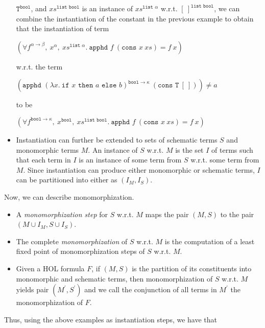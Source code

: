 \documentclass{article}
\begin{document}
\begin{itemize}
			$\texttt{T}^{\texttt{bool}}$, 
			and $xs^{\texttt{list bool}}$ is 
			an instance of 
			$xs^{\texttt{list }\alpha}$ 
			w.r.t. $[\ ]^{\texttt{list bool}}$,
			we can combine the instantiation 
			of the constant in the previous 
			example to obtain that the 
			instantiation of term
			\begin{center}
				$(\forall f^{\alpha \to \beta},\ 
				x^{\alpha},\ xs^{\texttt{list }
				\alpha}.\ \texttt{apphd }f\ 
				(\texttt{cons }x\ xs) = f\ x)$
			\end{center}
			w.r.t. the term
			\begin{center}
				$(\texttt{apphd }(\lambda 
				x.\ \texttt{if }x\texttt{ then }
				a \texttt{ else } b)^{\texttt{bool} 
				\to \kappa}\ (\texttt{cons T}\ 
				[\ ])) \neq a$
			\end{center}
			to be
			\begin{center}
				$(\forall f^{\texttt{bool}
				\to \kappa},\ x^{\texttt{bool}},
				\ xs^{\texttt{list bool}}.\ 
				\texttt{apphd }f\ (\texttt{cons }x
				\ xs) = f\ x)$
			\end{center}
		\item Instantiation can further be 
			extended to sets of schematic 
			terms $S$ and monomorphic terms $M$. 
			An instance of $S$ w.r.t. 
			$M$ is the set $I$ of terms such 
			that each term in $I$ is an instance 
			of some term from $S$ w.r.t. 
			some term from $M$. Since 
			instantiation can produce either 
			monomorphic or schematic terms, $I$
			can be partitioned into either as
			$(I_M, I_S)$.
		\end{itemize}
		Now, we can describe monomorphization.
		\begin{itemize}
		\item A \textit{monomorphization 
			step} for $S$ w.r.t. $M$ maps 
			the pair $(M,S)$ to the pair 
			$(M \cup I_M, S \cup I_S)$.
		\item The complete 
			\textit{monomorphization} of $S$ 
			w.r.t. $M$ is the computation of 
			a least fixed point of 
			monomorphization steps of $S$ 
			w.r.t. $M$.
		\item Given a HOL formula $F$, 
			if $(M, S)$ is the partition of its 
			constituents into monomorphic and 
			schematic terms, then 
			monomorphization of $S$ 
			w.r.t. $M$ yields pair 
			$(M^{\prime}, S^{\prime})$ and we 
			call the conjunction of all terms in 
			$M^{\prime}$ the monomorphization 
			of $F$.
		\end{itemize}
		Thus, using the above examples as 
		instantiation steps, we have that 
\end{document}
